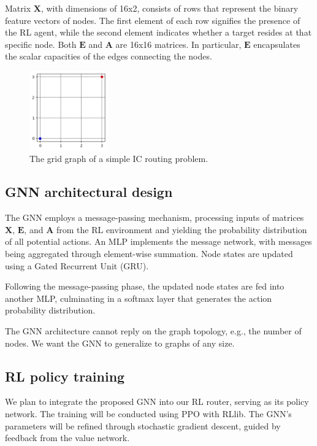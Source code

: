 \documentclass[letterpaper]{article}
\begin{document}
Matrix $\mathbf{X}$, with dimensions of 16x2, consists of rows that represent the binary feature vectors of nodes. The first element of each row signifies the presence of the RL agent, while the second element indicates whether a target resides at that specific node. Both $\mathbf{E}$ and $\mathbf{A}$ are 16x16 matrices. In particular, $\mathbf{E}$ encapsulates the scalar capacities of the edges connecting the nodes.


\begin{figure}[h!]
    \centering
    \includegraphics[width=0.3\textwidth]{figure/grid_grap.png}
    \caption{The grid graph of a simple IC routing problem.}
    \label{fig:grid}
\end{figure}

\subsection{GNN architectural design}
The GNN employs a message-passing mechanism, processing inputs of matrices $\mathbf{X}$, $\mathbf{E}$, and $\mathbf{A}$ from the RL environment and yielding the probability distribution of all potential actions. An MLP implements the message network, with messages being aggregated through element-wise summation. Node states are updated using a Gated Recurrent Unit (GRU). 

Following the message-passing phase, the updated node states are fed into another MLP, culminating in a softmax layer that generates the action probability distribution.

The GNN architecture cannot reply on the graph topology, e.g., the number of nodes. We want the GNN to generalize to graphs of any size. 

\subsection{RL policy training}
We plan to integrate the proposed GNN into our RL router, serving as its policy network. The training will be conducted using PPO with RLlib. The GNN's parameters will be refined through stochastic gradient descent, guided by feedback from the value network.
\end{document}
